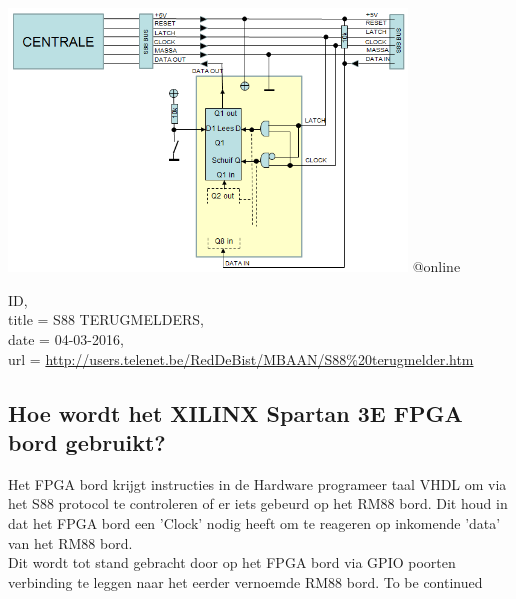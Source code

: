 \includegraphics[width=400px]{./img/S88Bus.png}
@online{ID,\\
	title = {S88 TERUGMELDERS},\\
	date = {04-03-2016},\\
	url = \url{http://users.telenet.be/RedDeBist/MBAAN/S88\%20terugmelder.htm}
		
	}
\clearpage
	
\subsection{Hoe wordt het XILINX Spartan 3E FPGA bord gebruikt?}
Het FPGA bord krijgt instructies in de Hardware programeer taal VHDL om via het S88 protocol te controleren of er iets gebeurd op het RM88 bord. Dit houd in dat het FPGA bord een 'Clock' nodig heeft om te reageren op inkomende 'data' van het RM88 bord.\\
Dit wordt tot stand gebracht door op het FPGA bord via GPIO poorten verbinding te leggen naar het eerder vernoemde RM88 bord. To be continued